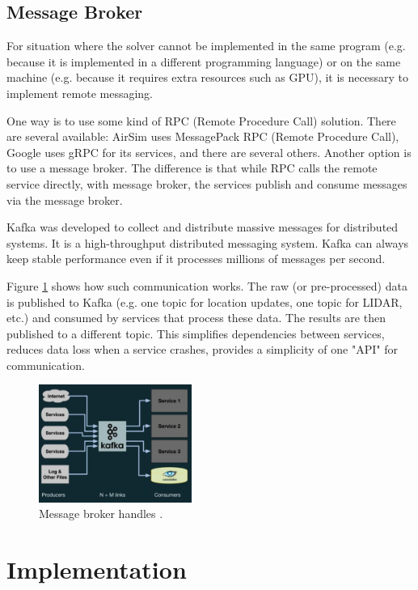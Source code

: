 \documentclass{article}
\begin{document}
\subsection{Message Broker}
For situation where the solver cannot be implemented in the same program (e.g. because it is implemented in a different programming language) or on the same machine (e.g. because it requires extra resources such as GPU), it is necessary to implement remote messaging.
 
One way is to use some kind of RPC (Remote Procedure Call) solution. There are several available: AirSim uses MessagePack RPC (Remote Procedure Call), Google uses gRPC for its services, and there are several others. Another option is to use a message broker. The difference is that while RPC calls the remote service directly, with message broker, the services publish and consume messages via the message broker.

Kafka was developed to collect and distribute massive messages for distributed systems. It is a high-throughput distributed messaging system. Kafka can always keep stable performance even if it processes millions of messages per second. \cite{wang2015kafka}

Figure \ref{fig:after-kafka} shows how such communication works. The raw (or pre-processed) data is published to Kafka (e.g. one topic for location updates, one topic for LIDAR, etc.) and consumed by services that process these data. The results are then published to a different topic. This simplifies dependencies between services, reduces data loss when a service crashes, provides a simplicity of one "API" for communication.



\begin{figure}
	\centering
	\includegraphics[width=5cm]{after-kafka}
	\caption{Message broker handles  .}\label{fig:after-kafka}
\end{figure}



\section{Implementation}
\end{document}

